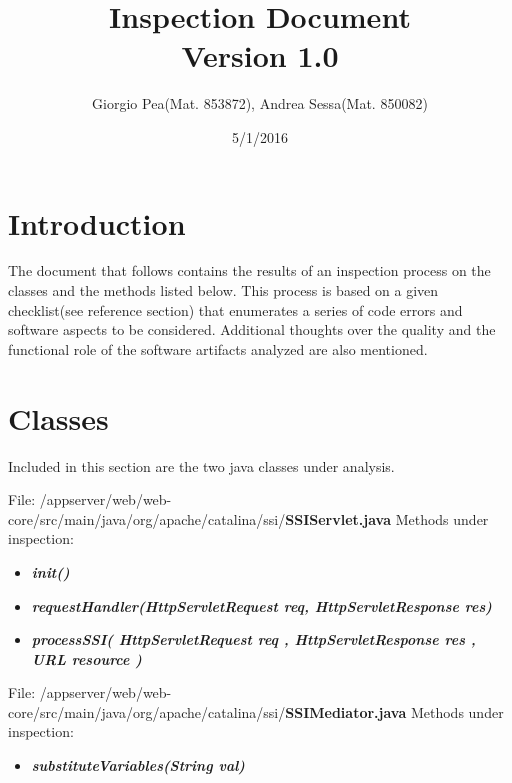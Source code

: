 \documentclass[11pt,titlepage]{article} %
\title{Inspection Document \\ \vspace{1cm} \large{Version 1.0}}
\author{Giorgio Pea(Mat. 853872), Andrea Sessa(Mat. 850082)}
\date{5/1/2016}
\begin{document}
\maketitle

\newpage

\tableofcontents

\newpage

\section{Introduction}
  The document that follows contains the results of an inspection process on
  the classes and the methods listed below.\newline
  This process is based on a given checklist(see reference section) that enumerates a series of
  code errors and software aspects to be considered. Additional thoughts over the quality and the functional
  role of the software artifacts analyzed are also mentioned.

\section{Classes}

Included in this section are the two java classes under analysis.\newline

\noindent File: /appserver/web/web-core/src/main/java/org/apache/catalina/ssi/\textbf{SSIServlet.java}\newline\newline
Methods under inspection:
  \begin{itemize}
    \item \textbf{\textit{init()}}
    \item \textbf{\textit{requestHandler(HttpServletRequest req, HttpServletResponse res)}}
    \item \textbf{\textit{processSSI( HttpServletRequest req , HttpServletResponse res , URL resource )}}
  \end{itemize}

\noindent File: /appserver/web/web-core/src/main/java/org/apache/catalina/ssi/\textbf{SSIMediator.java}\newline\newline
Methods under inspection:
  \begin{itemize}
    \item \textbf{\textit{substituteVariables(String val)}}
  \end{itemize}
\end{document}
